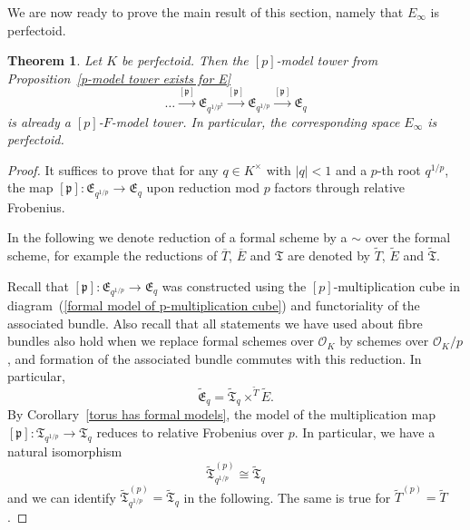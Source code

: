 \documentclass[10pt,oneside]{amsart}
\newtheorem{theorem}{Theorem}[section]
\theoremstyle{definition}
\theoremstyle{remark}
\begin{document}
	We are now ready to prove the main result of this section, namely that $E_\infty$ is perfectoid.
	\begin{theorem}\label{p-F-model tower exists for E}
		Let $K$ be perfectoid. Then the $[p]$-model tower from Proposition~\ref{p-model tower exists for E}
		\[\dots \xrightarrow{[\mathfrak p]} \mathfrak E_{q^{1/p^2}}\xrightarrow{[\mathfrak p]} \mathfrak E_{q^{1/p}}\xrightarrow{[\mathfrak p]} \mathfrak E_q\]
		 is already a $[p]$-$F$-model tower.
		In particular, the corresponding space $E_\infty$ is perfectoid.
	\end{theorem}
	\begin{proof}
	
	It suffices to prove that for any $q\in K^\times$ with $|q|<1$ and a $p$-th root $q^{1/p}$, the map $[\mathfrak p]:\mathfrak E_{q^{1/p}}\xrightarrow{} \mathfrak E_q$ upon reduction mod $p$ factors through relative Frobenius.
	
	In the following we denote reduction of a formal scheme by a $\sim$ over the formal scheme, for example the reductions of $\overline{T}$, $\overline{E}$ and $\mathfrak T$ are denoted by $\tilde{T}$, $\tilde{E}$ and $\tilde{\mathfrak{T}}$.
	
		
	Recall that $[\mathfrak p]:\mathfrak E_{q^{1/p}}\xrightarrow{} \mathfrak E_q$ was constructed using the $[p]$-multiplication cube in diagram~(\ref{formal model of p-multiplication cube}) and functoriality of the associated bundle. 	
	Also recall that all statements we have used about fibre bundles also hold when we replace formal schemes over $\mathcal O_K$ by schemes over $\mathcal O_K/p$, and formation of the associated bundle commutes with this reduction. In particular,
	\[\tilde{\mathfrak{E}}_q = \tilde{\mathfrak T}_q\times^{\tilde{T}}\tilde E.\]
	By  Corollary~\ref{torus has formal models}, the model of the multiplication map $[\mathfrak p]:\mathfrak T_{q^{1/p}} \rightarrow \mathfrak T_{q}$ reduces to relative Frobenius over $p$. In particular, we have a natural isomorphism
	\[\tilde{\mathfrak T}_{q^{1/p}}^{(p)} \cong \tilde{\mathfrak T}_{q}\]
	and we can identify $\tilde{\mathfrak T}_{q^{1/p}}^{(p)} = \tilde{\mathfrak T}_{q}$ in the following. The same is true for $\tilde{T}^{(p)} = \tilde{T}$.
	

\end{proof}
\end{document}
